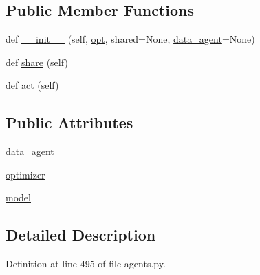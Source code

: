 \subsection*{Public Member Functions}
\begin{DoxyCompactItemize}
\item 
def \hyperlink{classmastering__the__dungeon_1_1agents_1_1graph__world2_1_1agents_1_1ModelAgentBase_ab5239a180244efc72ee522841d67b1c9}{\+\_\+\+\_\+init\+\_\+\+\_\+} (self, \hyperlink{classparlai_1_1core_1_1agents_1_1Agent_ab3b45d2754244608c75d4068b90cd051}{opt}, shared=None, \hyperlink{classmastering__the__dungeon_1_1agents_1_1graph__world2_1_1agents_1_1ModelAgentBase_a3c6da213b730abbba55d22aed93ab5ad}{data\+\_\+agent}=None)
\item 
def \hyperlink{classmastering__the__dungeon_1_1agents_1_1graph__world2_1_1agents_1_1ModelAgentBase_a8ed913cf175f244f6fd537df2e784121}{share} (self)
\item 
def \hyperlink{classmastering__the__dungeon_1_1agents_1_1graph__world2_1_1agents_1_1ModelAgentBase_a768f25fa424b2cd4d1de8e62bfed970a}{act} (self)
\end{DoxyCompactItemize}
\subsection*{Public Attributes}
\begin{DoxyCompactItemize}
\item 
\hyperlink{classmastering__the__dungeon_1_1agents_1_1graph__world2_1_1agents_1_1ModelAgentBase_a3c6da213b730abbba55d22aed93ab5ad}{data\+\_\+agent}
\item 
\hyperlink{classmastering__the__dungeon_1_1agents_1_1graph__world2_1_1agents_1_1ModelAgentBase_a853b9d9c13d35c0f00a04ad9eea73668}{optimizer}
\item 
\hyperlink{classmastering__the__dungeon_1_1agents_1_1graph__world2_1_1agents_1_1ModelAgentBase_a702a30a15a5e6feb5d78751d6708766c}{model}
\end{DoxyCompactItemize}


\subsection{Detailed Description}


Definition at line 495 of file agents.\+py.



